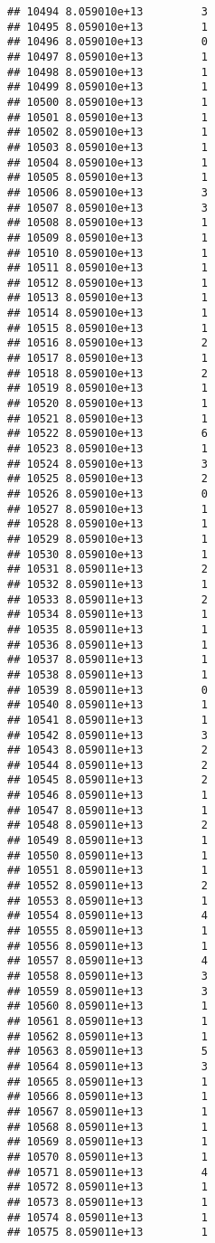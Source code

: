 \documentclass[
]{article}
\begin{document}
\begin{verbatim}
## 10494 8.059010e+13         3
## 10495 8.059010e+13         1
## 10496 8.059010e+13         0
## 10497 8.059010e+13         1
## 10498 8.059010e+13         1
## 10499 8.059010e+13         1
## 10500 8.059010e+13         1
## 10501 8.059010e+13         1
## 10502 8.059010e+13         1
## 10503 8.059010e+13         1
## 10504 8.059010e+13         1
## 10505 8.059010e+13         1
## 10506 8.059010e+13         3
## 10507 8.059010e+13         3
## 10508 8.059010e+13         1
## 10509 8.059010e+13         1
## 10510 8.059010e+13         1
## 10511 8.059010e+13         1
## 10512 8.059010e+13         1
## 10513 8.059010e+13         1
## 10514 8.059010e+13         1
## 10515 8.059010e+13         1
## 10516 8.059010e+13         2
## 10517 8.059010e+13         1
## 10518 8.059010e+13         2
## 10519 8.059010e+13         1
## 10520 8.059010e+13         1
## 10521 8.059010e+13         1
## 10522 8.059010e+13         6
## 10523 8.059010e+13         1
## 10524 8.059010e+13         3
## 10525 8.059010e+13         2
## 10526 8.059010e+13         0
## 10527 8.059010e+13         1
## 10528 8.059010e+13         1
## 10529 8.059010e+13         1
## 10530 8.059010e+13         1
## 10531 8.059011e+13         2
## 10532 8.059011e+13         1
## 10533 8.059011e+13         2
## 10534 8.059011e+13         1
## 10535 8.059011e+13         1
## 10536 8.059011e+13         1
## 10537 8.059011e+13         1
## 10538 8.059011e+13         1
## 10539 8.059011e+13         0
## 10540 8.059011e+13         1
## 10541 8.059011e+13         1
## 10542 8.059011e+13         3
## 10543 8.059011e+13         2
## 10544 8.059011e+13         2
## 10545 8.059011e+13         2
## 10546 8.059011e+13         1
## 10547 8.059011e+13         1
## 10548 8.059011e+13         2
## 10549 8.059011e+13         1
## 10550 8.059011e+13         1
## 10551 8.059011e+13         1
## 10552 8.059011e+13         2
## 10553 8.059011e+13         1
## 10554 8.059011e+13         4
## 10555 8.059011e+13         1
## 10556 8.059011e+13         1
## 10557 8.059011e+13         4
## 10558 8.059011e+13         3
## 10559 8.059011e+13         3
## 10560 8.059011e+13         1
## 10561 8.059011e+13         1
## 10562 8.059011e+13         1
## 10563 8.059011e+13         5
## 10564 8.059011e+13         3
## 10565 8.059011e+13         1
## 10566 8.059011e+13         1
## 10567 8.059011e+13         1
## 10568 8.059011e+13         1
## 10569 8.059011e+13         1
## 10570 8.059011e+13         1
## 10571 8.059011e+13         4
## 10572 8.059011e+13         1
## 10573 8.059011e+13         1
## 10574 8.059011e+13         1
## 10575 8.059011e+13         1

\end{verbatim}
\end{document}
